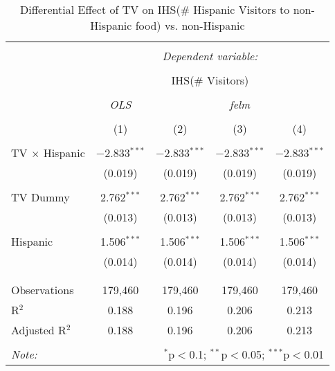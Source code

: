 
\begin{table}[!htbp] \centering 
  \caption{Differential Effect of TV on IHS(\# Hispanic Visitors to non-Hispanic food) vs. non-Hispanic} 
  \label{} 
\begin{tabular}{@{\extracolsep{-2pt}}lcccc} 
\\[-1.8ex]\hline 
\hline \\[-1.8ex] 
 & \multicolumn{4}{c}{\textit{Dependent variable:}} \\ 
\cline{2-5} 
\\[-1.8ex] & \multicolumn{4}{c}{IHS(\# Visitors)} \\ 
\\[-1.8ex] & \textit{OLS} & \multicolumn{3}{c}{\textit{felm}} \\ 
\\[-1.8ex] & (1) & (2) & (3) & (4)\\ 
\hline \\[-1.8ex] 
 TV $\times$ Hispanic & $-$2.833$^{***}$ & $-$2.833$^{***}$ & $-$2.833$^{***}$ & $-$2.833$^{***}$ \\ 
  & (0.019) & (0.019) & (0.019) & (0.019) \\ 
  & & & & \\ 
 TV Dummy & 2.762$^{***}$ & 2.762$^{***}$ & 2.762$^{***}$ & 2.762$^{***}$ \\ 
  & (0.013) & (0.013) & (0.013) & (0.013) \\ 
  & & & & \\ 
 Hispanic & 1.506$^{***}$ & 1.506$^{***}$ & 1.506$^{***}$ & 1.506$^{***}$ \\ 
  & (0.014) & (0.014) & (0.014) & (0.014) \\ 
  & & & & \\ 
\hline \\[-1.8ex] 
Observations & 179,460 & 179,460 & 179,460 & 179,460 \\ 
R$^{2}$ & 0.188 & 0.196 & 0.206 & 0.213 \\ 
Adjusted R$^{2}$ & 0.188 & 0.196 & 0.206 & 0.213 \\ 
\hline 
\hline \\[-1.8ex] 
\textit{Note:}  & \multicolumn{4}{r}{$^{*}$p$<$0.1; $^{**}$p$<$0.05; $^{***}$p$<$0.01} \\ 
\end{tabular} 
\end{table} 
